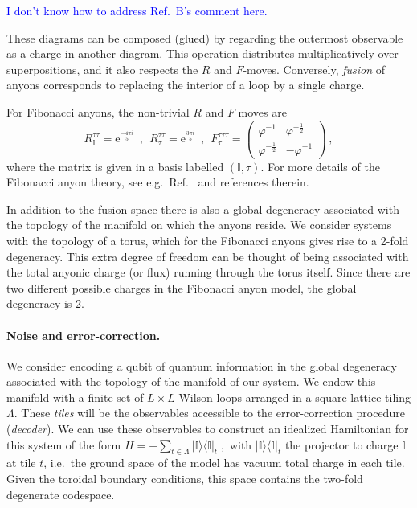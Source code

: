 \documentclass[aps, prl, letterpaper, twocolumn, superscriptaddress, notitlepage, 10pt]{revtex4-1}
\newcommand{\e}{\mathrm{e}}
\newcommand{\vac}{\mathbb{I}}
\newcommand{\ket}[1]{|{#1}\rangle}
\newcommand{\bra}[1]{\langle{#1}|}
\newcommand{\ketbra}[2]{\ket{#1}\!\bra{#2}}
\newcommand{\proj}[1]{\ketbra{#1}{#1}}
\newcommand{\cggb}[1]{\textcolor{blue}{#1}}
\begin{document}
\cggb{I don't know how to address Ref.~B's comment here.}

These diagrams can be composed (glued)
by regarding the outermost observable
as a charge in another diagram.
This operation distributes multiplicatively
over superpositions, and it also respects the $R$ and $F$-moves.
Conversely, \emph{fusion} of anyons corresponds to 
replacing the interior of a loop by a single charge.

For Fibonacci anyons, the non-trivial $R$ and $F$ moves are 
\begin{equation*}
	R_{\vac}^{\tau\tau} = \e^{\frac{-4\pi i}{5}} 
	\ \ , \ \
	R_\tau^{\tau\tau}= \e^{\frac{3\pi i}{5}} 
	\ \ , \ \
	F_{\tau}^{\tau\tau\tau} = \begin{pmatrix}\varphi^{-1}&\varphi^{-\frac{1}{2}}\\\varphi^{-\frac{1}{2}}&-\varphi^{-1}\end{pmatrix} \,,
\end{equation*}
where the matrix is given in a basis labelled $(\vac,\tau)$. For more details of the Fibonacci anyon theory, see e.g.\ Ref.~\cite{Nayak2008} and references therein. 

In addition to the fusion space there is also a global degeneracy associated with the topology of the 
manifold on which the anyons reside. We consider systems with the topology of a torus, 
which for the Fibonacci anyons gives rise to a 2-fold degeneracy.
This extra degree of freedom can be thought of being associated with the total anyonic charge (or flux) running through the torus itself. Since there are two different possible charges in the Fibonacci anyon model, the global degeneracy is 2.

\paragraph{Noise and error-correction.}

We consider encoding a qubit of quantum information in the global degeneracy associated 
with the topology of the manifold of our system.
We endow this manifold with a finite set of $L\times L$ Wilson loops arranged in
a square lattice tiling $\Lambda$.
These \emph{tiles} will be the observables accessible to the error-correction procedure (\emph{decoder}).
We can use these observables to construct an idealized Hamiltonian for this system of the form
 $H=-\sum_{t\in \Lambda}\proj{\vac}_t\;,$ 
with $\proj{\vac}_t$ the projector to charge $\vac$ at tile $t$, i.e.~the ground 
space of the model has vacuum total charge in each tile.
Given the toroidal boundary 
conditions, this space contains the two-fold degenerate codespace.
\end{document}
